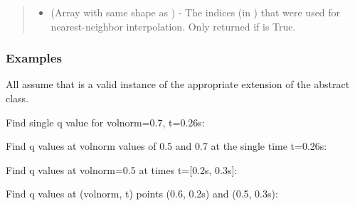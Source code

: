 \documentclass[letterpaper,10pt,english]{sphinxmanual}
\begin{document}
\begin{fulllineitems}
\begin{fulllineitems}
\begin{quote}
\begin{description}
\begin{itemize}
\item {} 
 (Array with same shape as ) - The indices
(in ) that were used for
nearest-neighbor interpolation. Only returned if  is
True.

\end{itemize}


\end{description}\end{quote}
\subsubsection*{Examples}

All assume that  is a valid instance of the appropriate
extension of the {\hyperref[\detokenize{eqtools:eqtools.core.Equilibrium}]{}} abstract class.

Find single q value for volnorm=0.7, t=0.26s:

\begin{sphinxVerbatim}[commandchars=\\\{\}]
   
\end{sphinxVerbatim}

Find q values at volnorm values of 0.5 and 0.7 at the single time
t=0.26s:

\begin{sphinxVerbatim}[commandchars=\\\{\}]
  \PYG{p}{[} \PYG{p}{]} 
\end{sphinxVerbatim}

Find q values at volnorm=0.5 at times t={[}0.2s, 0.3s{]}:

\begin{sphinxVerbatim}[commandchars=\\\{\}]
   \PYG{p}{[} \PYG{p}{]}
\end{sphinxVerbatim}

Find q values at (volnorm, t) points (0.6, 0.2s) and (0.5, 0.3s):


\end{fulllineitems}
\end{fulllineitems}
\end{document}
